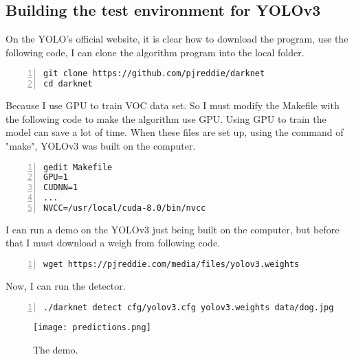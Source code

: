 \documentclass[a4paper]{article}
\begin{document}
\subsection{Building the test environment for YOLOv3 \cite{note2}}
On the YOLO's official website, it is clear how to download the program, use the following code, I can clone the algorithm program into the local folder. 
\par
\begin{lstlisting}[numbers=left, numberstyle=\tiny,keywordstyle=\color{blue!70},commentstyle=\color{red!50!green!50!blue!50},frame=shadowbox, rulesepcolor=\color{red!20!green!20!blue!20}] 
git clone https://github.com/pjreddie/darknet
cd darknet
\end{lstlisting}
\par
Because I use GPU to train VOC data set. So I must modify the Makefile with the following code to make the algorithm use GPU. Using GPU to train the model can save a lot of time. When these files are set up, using the command of "make", YOLOv3 was built on the computer. 
\begin{lstlisting}[numbers=left, numberstyle=\tiny,keywordstyle=\color{blue!70},commentstyle=\color{red!50!green!50!blue!50},frame=shadowbox, rulesepcolor=\color{red!20!green!20!blue!20}] 
gedit Makefile
GPU=1
CUDNN=1
...
NVCC=/usr/local/cuda-8.0/bin/nvcc
\end{lstlisting}
\par
I can run a demo on the YOLOv3 just being built on the computer, but before that I must download a weigh from following code.
\begin{lstlisting}[numbers=left, numberstyle=\tiny,keywordstyle=\color{blue!70},commentstyle=\color{red!50!green!50!blue!50},frame=shadowbox, rulesepcolor=\color{red!20!green!20!blue!20}] 
wget https://pjreddie.com/media/files/yolov3.weights
\end{lstlisting}
\par
Now, I can run the detector.
\begin{lstlisting}[numbers=left, numberstyle=\tiny,keywordstyle=\color{blue!70},commentstyle=\color{red!50!green!50!blue!50},frame=shadowbox, rulesepcolor=\color{red!20!green!20!blue!20}] 
./darknet detect cfg/yolov3.cfg yolov3.weights data/dog.jpg
\end{lstlisting}
\begin{figure}[h]
\begin{center}
  \texttt{[image: predictions.png]}\\
  \caption{The demo.}\label{2}
\end{center}
\end{figure}
\end{document}
